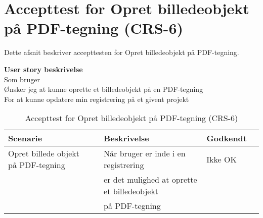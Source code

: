 \section{Accepttest for Opret billedeobjekt på PDF-tegning (CRS-6)}
Dette afsnit beskriver accepttesten for Opret billedeobjekt på PDF-tegning.

\textbf{User story beskrivelse} \\
Som bruger \\
Ønsker jeg at kunne oprette et billedeobjekt på en PDF-tegning \\
For at kunne opdatere min registrering på et givent projekt

\begin{table}[H]
	\centering
	\begin{tabular}{|ll|l|ll|} \hline
		\textbf{Scenarie} &  & \textbf{Beskrivelse}&  \textbf{Godkendt}&  \\ \hline
		Opret billede objekt på PDF-tegning&  &  Når bruger er inde i en registrering &  Ikke OK&  \\
		& & er det mulighed at oprette et billedeobjekt& & \\ 
		& & på PDF-tegning& & \\ \hline
	\end{tabular}
	\caption{Accepttest for Opret billedeobjekt på PDF-tegning (CRS-6)}
	\label{AcceptBillede}
\end{table}

\clearpage